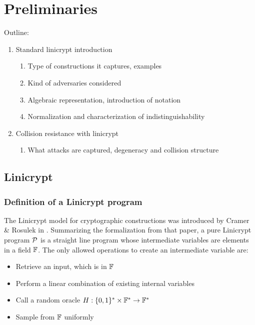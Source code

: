 \chapter{Preliminaries}

Outline:
\begin{enumerate}
  \item Standard linicrypt introduction
  \begin{enumerate}
  \item Type of constructions it captures, examples
  \item Kind of adversaries considered
  \item Algebraic representation, introduction of notation
  \item Normalization and characterization of indistinguishability
  \end{enumerate}

  \item Collision resistance with linicrypt
  \begin{enumerate}
  \item What attacks are captured, degeneracy and collision structure
  \end{enumerate}
\end{enumerate}

\section{Linicrypt}
\subsection{Definition of a Linicrypt program}

The Linicrypt model for cryptographic constructions was introduced by Cramer \& Rosulek in \cite{RC16}.
Summarizing the formalization from that paper,
a pure Linicrypt program $\P$ is a straight line program
whose intermediate variables are elements in a field $\F$.
The only allowed operations to create an intermediate variable are:
\begin{itemize}
  \item Retrieve an input, which is in $\F$
  \item Perform a linear combination of existing internal variables
  \item Call a random oracle $\H: \{0,1\}^* \times \F^* \to \F^*$
  \item Sample from $\F$ uniformly
\end{itemize}

